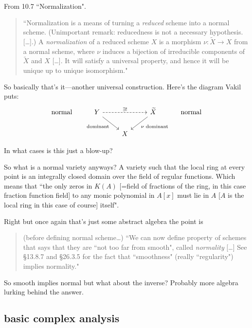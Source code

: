 From \cite{sea} 10.7 ``Normalization".

\begin{quotation}
	``Normalization is a means of turning a \textit{reduced} scheme into a normal scheme. (Unimportant remark: reducedness is not a necessary hypothesis. […].) A \textit{normalization} of a reduced scheme \(X\) is a morphism \(\nu:\widetilde{X}\to X\) from a normal scheme, where \(\nu\) induces a bijection of irreducible components of \(\widetilde{X}\) and \(X\) […]. It will satisfy a universal property, and hence it will be unique up to unique isomorphism."
\end{quotation}
So basically that's it---another universal construction. Here's the diagram Vakil puts:
\[\begin{tikzcd}
\text{normal} &Y\arrow[rr,"\exists !",dashed]\arrow[dr,"\text{dominant} ",swap]&&\widetilde{X}\arrow[dl,"\nu\text{ dominant} "]& \text{ normal} \\
&&X
\end{tikzcd}\]

\begin{question}\leavevmode
In what cases is this just a blow-up?
\end{question}

\begin{question}\leavevmode
	So what is a normal variety anyways? A variety such that the local ring at every point is an integrally closed domain over the field of regular functions. Which means that ``the only zeros in \(K(A)\) [=field of fractions of the ring, in this case fraction function field] to any monic polynomial in \(A[x]\) must lie in \(A\) [\(A\) is the local ring in this case of course] itself".
\end{question}

Right but once again that's just some abstract algebra the point is
\begin{quotation}
	(before defining normal scheme…) ``We can now define  property of schemes that says that they are ``not too far from smooth", called \textit{normality} […] See §13.8.7 and §26.3.5 for the fact that ``smoothness" (really ``regularity") implies normality."
\end{quotation}
So smooth implies normal but what about the inverse? Probably more algebra lurking behind the answer.

\subsection{basic complex analysis}

